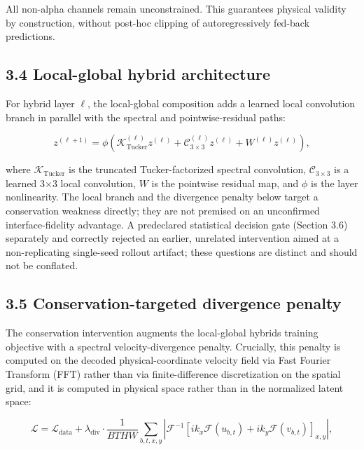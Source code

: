 \documentclass[preprint,12pt]{elsarticle}
\begin{document}
All non-alpha channels remain unconstrained. This guarantees physical
validity by construction, without post-hoc clipping of autoregressively
fed-back predictions.

\subsection*{3.4 Local-global hybrid
architecture}\label{34-local-global-hybrid-architecture}

For hybrid layer \(\ell\), the local-global composition adds a learned
local convolution branch in parallel with the spectral and
pointwise-residual paths:

\[
z^{(\ell+1)} = \phi\!\left(\mathcal{K}^{(\ell)}_{\text{Tucker}}z^{(\ell)} + \mathcal{C}^{(\ell)}_{3\times 3}z^{(\ell)} + W^{(\ell)}z^{(\ell)}\right), \tag{2}
\]

where \(\mathcal{K}_{\text{Tucker}}\) is the truncated Tucker-factorized
spectral convolution, \(\mathcal{C}_{3\times3}\) is a learned 3\ensuremath{\times}3 local
convolution, \(W\) is the pointwise residual map, and \(\phi\) is the
layer nonlinearity. The local branch and the divergence penalty below
target a conservation weakness directly; they are not premised on an
unconfirmed interface-fidelity advantage. A predeclared statistical
decision gate (Section 3.6) separately and correctly rejected an
earlier, unrelated intervention aimed at a non-replicating single-seed
rollout artifact; these questions are distinct and should not be
conflated.

\subsection*{3.5 Conservation-targeted divergence
penalty}\label{35-conservation-targeted-divergence-penalty}

The conservation intervention augments the local-global
hybrid\textquotesingle s training objective with a spectral
velocity-divergence penalty. Crucially, this penalty is computed on the
decoded physical-coordinate velocity field via Fast Fourier Transform
(FFT) rather than via finite-difference discretization on the spatial
grid, and it is computed in physical space rather than in the normalized
latent space:

\[
\mathcal{L} = \mathcal{L}_{\text{data}} + \lambda_{\text{div}} \cdot \frac{1}{BTHW}\sum_{b,t,x,y} \left| \mathcal{F}^{-1}\!\left[ i k_x \mathcal{F}(u_{b,t}) + i k_y \mathcal{F}(v_{b,t}) \right]_{x,y} \right|, \tag{3}
\]
\end{document}
